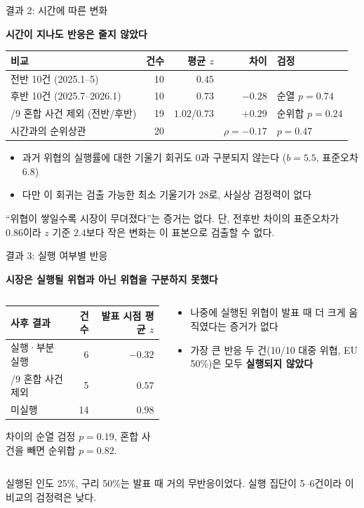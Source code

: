 \documentclass[aspectratio=169,9pt,t]{beamer}
\newcommand{\msg}[1]{{\fontsize{11.5}{15}\selectfont\bfseries\color{navy}\RaggedRight #1\par}\vspace{2.0mm}}
\newcommand{\takeaway}[1]{%
  \par\vfill
  \noindent\colorbox{wash}{\begin{minipage}[c]{\dimexpr\linewidth-2\fboxsep\relax}\vspace{0.5mm}\hspace{1.5mm}{\color{crim}\bfseries$\rightarrow$}\hspace{1.5mm}%
  \begin{minipage}[c]{\dimexpr\linewidth-9mm\relax}\fontsize{8.6}{11}\selectfont\RaggedRight #1\end{minipage}\vspace{0.5mm}\end{minipage}}\par\vspace{0.8mm}}
\renewcommand{\arraystretch}{1.3}
\newcommand{\tf}{\fontsize{8.2}{10.4}\selectfont}
\newcommand{\tfs}{\fontsize{7.5}{9.4}\selectfont\renewcommand{\arraystretch}{1.18}}
\begin{document}
\begin{frame}{결과 2: 시간에 따른 변화}
\msg{시간이 지나도 반응은 줄지 않았다}
\begingroup\tfs
\begin{tabularx}{\textwidth}{@{}L{0.36\textwidth}rrrY@{}}
\toprule
비교 & 건수 & 평균 $z$ & 차이 & 검정\\
\midrule
전반 10건 (2025.1--5) & 10 & $0.45$ & & \\
후반 10건 (2025.7--2026.1) & 10 & $0.73$ & $-0.28$ & 순열 $p=0.74$\\
/9 혼합 사건 제외 (전반/후반) & 19 & $1.02$/$0.73$ & $+0.29$ & 순위합 $p=0.24$\\
시간과의 순위상관 & 20 & & $\rho=-0.17$ & $p=0.47$\\
\bottomrule
\end{tabularx}\endgroup
\vspace{2mm}
\begin{itemize}
\item 과거 위협의 실행률에 대한 기울기 회귀도 0과 구분되지 않는다 ($b=5.5$, 표준오차 $6.8$)
\item 다만 이 회귀는 검출 가능한 최소 기울기가 $28$로, 사실상 검정력이 없다
\end{itemize}
\takeaway{``위협이 쌓일수록 시장이 무뎌졌다''는 증거는 없다. 단, 전후반 차이의 표준오차가 $0.86$이라 $z$ 기준 $2.4$보다 작은 변화는 이 표본으로 검출할 수 없다.}
\end{frame}

\begin{frame}{결과 3: 실행 여부별 반응}
\msg{시장은 실행될 위협과 아닌 위협을 구분하지 못했다}
\begin{columns}[c,onlytextwidth]
\begin{column}{0.5\textwidth}
\begingroup\tf
\begin{tabularx}{\linewidth}{@{}Yrr@{}}
\toprule
사후 결과 & 건수 & 발표 시점 평균 $z$\\
\midrule
실행·부분 실행 & 6 & $-0.32$\\
/9 혼합 사건 제외 & 5 & $0.57$\\
미실행 & 14 & $0.98$\\
\bottomrule
\end{tabularx}\endgroup
\vspace{2mm}
{\small\RaggedRight 차이의 순열 검정 $p=0.19$, 혼합 사건을 빼면 순위합 $p=0.82$.\par}
\end{column}
\begin{column}{0.46\textwidth}
\begin{itemize}
\item 나중에 실행된 위협이 발표 때 더 크게 움직였다는 증거가 없다
\item 가장 큰 반응 두 건(10/10 대중 위협, EU 50\%)은 모두 \textbf{실행되지 않았다}
\end{itemize}
\end{column}
\end{columns}
\takeaway{실행된 인도 25\%, 구리 50\%는 발표 때 거의 무반응이었다. 실행 집단이 5--6건이라 이 비교의 검정력은 낮다.}
\end{frame}
\end{document}
